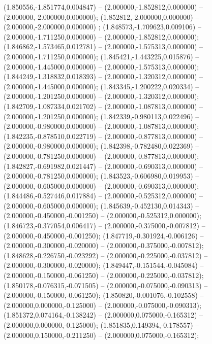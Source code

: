  (1.850556,-1.851774,0.004847) -- (2.000000,-1.852812,0.000000) -- (2.000000,-2.000000,0.000000);
 (1.852812,-2.000000,0.000000) -- (2.000000,-2.000000,0.000000) ;
 (1.848573,-1.709623,0.009106) -- (2.000000,-1.711250,0.000000) -- (2.000000,-1.852812,0.000000);
 (1.846862,-1.573465,0.012781) -- (2.000000,-1.575313,0.000000) -- (2.000000,-1.711250,0.000000);
 (1.845421,-1.443225,0.015876) -- (2.000000,-1.445000,0.000000) -- (2.000000,-1.575313,0.000000);
 (1.844249,-1.318832,0.018393) -- (2.000000,-1.320312,0.000000) -- (2.000000,-1.445000,0.000000);
 (1.843345,-1.200222,0.020334) -- (2.000000,-1.201250,0.000000) -- (2.000000,-1.320312,0.000000);
 (1.842709,-1.087334,0.021702) -- (2.000000,-1.087813,0.000000) -- (2.000000,-1.201250,0.000000);
 (1.842339,-0.980113,0.022496) -- (2.000000,-0.980000,0.000000) -- (2.000000,-1.087813,0.000000);
 (1.842235,-0.878510,0.022719) -- (2.000000,-0.877813,0.000000) -- (2.000000,-0.980000,0.000000);
 (1.842398,-0.782480,0.022369) -- (2.000000,-0.781250,0.000000) -- (2.000000,-0.877813,0.000000);
 (1.842827,-0.691982,0.021447) -- (2.000000,-0.690313,0.000000) -- (2.000000,-0.781250,0.000000);
 (1.843523,-0.606980,0.019953) -- (2.000000,-0.605000,0.000000) -- (2.000000,-0.690313,0.000000);
 (1.844486,-0.527446,0.017884) -- (2.000000,-0.525312,0.000000) -- (2.000000,-0.605000,0.000000);
 (1.845639,-0.452130,0.014343) -- (2.000000,-0.450000,-0.001250) -- (2.000000,-0.525312,0.000000);
 (1.846723,-0.377054,0.006417) -- (2.000000,-0.375000,-0.007812) -- (2.000000,-0.450000,-0.001250);
 (1.847719,-0.301924,-0.006126) -- (2.000000,-0.300000,-0.020000) -- (2.000000,-0.375000,-0.007812);
 (1.848628,-0.226750,-0.023292) -- (2.000000,-0.225000,-0.037812) -- (2.000000,-0.300000,-0.020000);
 (1.849447,-0.151544,-0.045084) -- (2.000000,-0.150000,-0.061250) -- (2.000000,-0.225000,-0.037812);
 (1.850178,-0.076315,-0.071505) -- (2.000000,-0.075000,-0.090313) -- (2.000000,-0.150000,-0.061250);
 (1.850820,-0.001076,-0.102558) -- (2.000000,0.000000,-0.125000) -- (2.000000,-0.075000,-0.090313);
 (1.851372,0.074164,-0.138242) -- (2.000000,0.075000,-0.165312) -- (2.000000,0.000000,-0.125000);
 (1.851835,0.149394,-0.178557) -- (2.000000,0.150000,-0.211250) -- (2.000000,0.075000,-0.165312);
